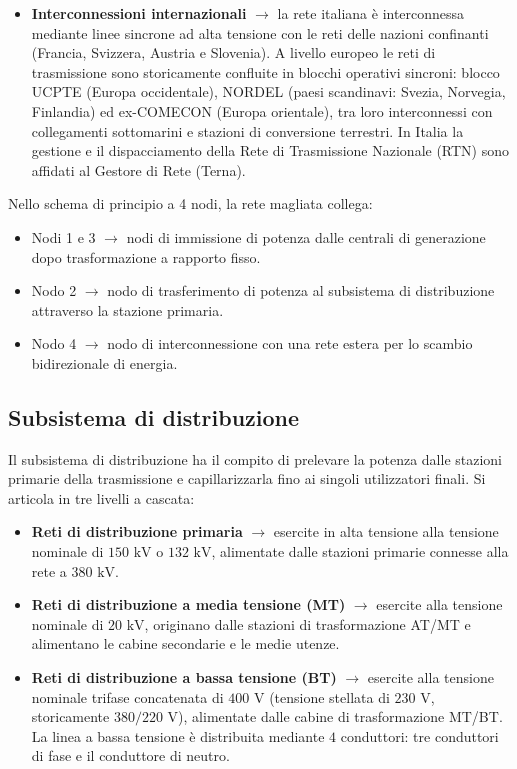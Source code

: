 \begin{itemize}
\begin{itemize}
        \item Cavo sottomarino in corrente continua di interconnessione tra l'Italia e la Grecia.
    \end{itemize}
    \item \textbf{Interconnessioni internazionali} $\rightarrow$ la rete italiana è interconnessa mediante linee sincrone ad alta tensione con le reti delle nazioni confinanti (Francia, Svizzera, Austria e Slovenia). A livello europeo le reti di trasmissione sono storicamente confluite in blocchi operativi sincroni: blocco UCPTE (Europa occidentale), NORDEL (paesi scandinavi: Svezia, Norvegia, Finlandia) ed ex-COMECON (Europa orientale), tra loro interconnessi con collegamenti sottomarini e stazioni di conversione terrestri. In Italia la gestione e il dispacciamento della Rete di Trasmissione Nazionale (RTN) sono affidati al Gestore di Rete (Terna).
\end{itemize}

Nello schema di principio a 4 nodi, la rete magliata collega:
\begin{itemize}
    \item Nodi 1 e 3 $\rightarrow$ nodi di immissione di potenza dalle centrali di generazione dopo trasformazione a rapporto fisso.
    \item Nodo 2 $\rightarrow$ nodo di trasferimento di potenza al subsistema di distribuzione attraverso la stazione primaria.
    \item Nodo 4 $\rightarrow$ nodo di interconnessione con una rete estera per lo scambio bidirezionale di energia.
\end{itemize}

\subsection{Subsistema di distribuzione}
Il subsistema di distribuzione ha il compito di prelevare la potenza dalle stazioni primarie della trasmissione e capillarizzarla fino ai singoli utilizzatori finali. Si articola in tre livelli a cascata:
\begin{itemize}
    \item \textbf{Reti di distribuzione primaria} $\rightarrow$ esercite in alta tensione alla tensione nominale di $150\text{ kV}$ o $132\text{ kV}$, alimentate dalle stazioni primarie connesse alla rete a $380\text{ kV}$.
    \item \textbf{Reti di distribuzione a media tensione (MT)} $\rightarrow$ esercite alla tensione nominale di $20\text{ kV}$, originano dalle stazioni di trasformazione AT/MT e alimentano le cabine secondarie e le medie utenze.
    \item \textbf{Reti di distribuzione a bassa tensione (BT)} $\rightarrow$ esercite alla tensione nominale trifase concatenata di $400\text{ V}$ (tensione stellata di $230\text{ V}$, storicamente $380/220\text{ V}$), alimentate dalle cabine di trasformazione MT/BT. La linea a bassa tensione è distribuita mediante $4$ conduttori: tre conduttori di fase e il conduttore di neutro.
\end{itemize}

